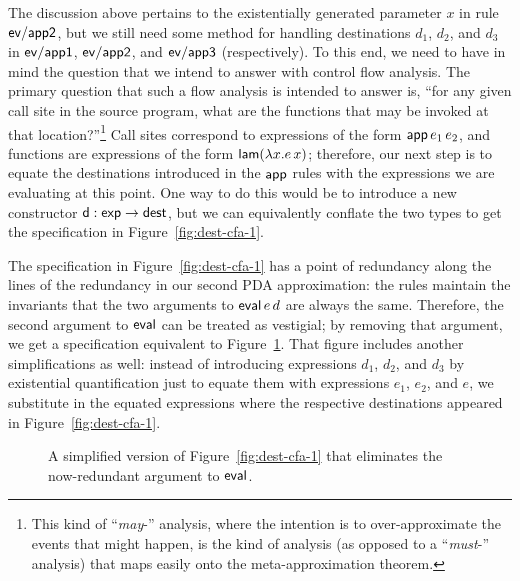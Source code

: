The discussion above pertains to the existentially generated parameter
$x$ in rule ${\sf ev/app2}$, but we still need some method for
handling destinations $d_1$, $d_2$, and $d_3$ in ${\sf ev/app1}$,
${\sf ev/app2}$, and ${\sf ev/app3}$ (respectively). To this end, we
need to have in mind the question that we intend to answer with
control flow analysis. The primary question that such a flow analysis
is intended to answer is, ``for any given call site in the source
program, what are the functions that may be invoked at that
location?''\footnote{This kind of ``{\it may}-'' analysis, where the
  intention is to over-approximate the events that might happen, is
  the kind of analysis (as opposed to a ``{\it must}-'' analysis) that
  maps easily onto the meta-approximation theorem.} Call sites
correspond to expressions of the form ${\sf app}\,e_1\,e_2$, and
functions are expressions of the form ${\sf lam}(\lambda x.e\,x)$;
therefore, our next step is to equate the destinations introduced in
the ${\sf app}$ rules with the expressions we are evaluating at this
point. One way to do this would be to introduce a new constructor
${\sf d}: {\sf exp} \rightarrow {\sf dest}$, but we can equivalently
conflate the two types to get the specification in
Figure~\ref{fig:dest-cfa-1}. 


The specification in Figure~\ref{fig:dest-cfa-1} has a point of
redundancy along the lines of the redundancy in our second PDA
approximation: the rules maintain the invariants that the two
arguments to ${\sf eval}\,e\,d$ are always the same. Therefore, the
second argument to ${\sf eval}$ can be treated as vestigial; by
removing that argument, we get a specification equivalent to
Figure~\ref{fig:dest-cfa-2}. That figure includes another
simplifications as well: instead of introducing expressions $d_1$,
$d_2$, and $d_3$ by existential quantification just to equate them
with expressions $e_1$, $e_2$, and $e$, we substitute in the equated
expressions where the respective destinations appeared in
Figure~\ref{fig:dest-cfa-1}. 

\begin{figure}[t]
\caption{A simplified version of Figure~\ref{fig:dest-cfa-1} that
  eliminates the now-redundant argument to ${\sf eval}$.}
\label{fig:dest-cfa-2}
\end{figure}

